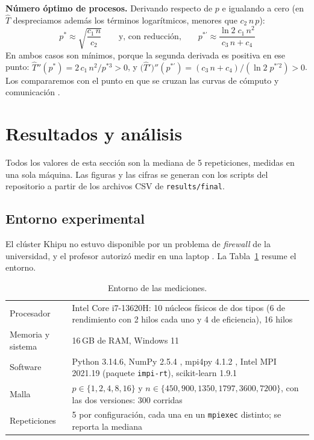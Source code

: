 \documentclass[11pt,a4paper]{article}
\begin{document}
\textbf{Número óptimo de procesos.} Derivando respecto de $p$ e igualando a cero (en $\hat T$ despreciamos además los términos logarítmicos, menores que $c_2\,n\,p$):
\[
p^*\approx\sqrt{\frac{c_1\,n}{c_2}}
\qquad\text{y, con reducción,}\qquad
p^{*\prime}\approx\frac{\ln 2\;c_1\,n^2}{c_3\,n+c_4}
\]
En ambos casos son mínimos, porque la segunda derivada es positiva en ese punto: $\hat T''(p^*)=2\,c_1\,n^2/p^{*3}>0$, y $\big(\hat T'\big)''(p^{*\prime})=(c_3\,n+c_4)/(\ln 2\;p^{*\prime 2})>0$. Los compararemos con el punto en que se cruzan las curvas de cómputo y comunicación \cite{slides}.

\section{Resultados y análisis}

Todos los valores de esta sección son la mediana de 5 repeticiones, medidas en una sola máquina. Las figuras y las cifras se generan con los scripts del repositorio a partir de los archivos CSV de \texttt{results/final}.

\subsection{Entorno experimental}
\label{sec:entorno}

El clúster Khipu no estuvo disponible por un problema de \textit{firewall} de la universidad, y el profesor autorizó medir en una laptop \cite{correo-profesor}. La Tabla~\ref{tab:entorno} resume el entorno.

\begin{table}[ht]
\centering\small
\begin{tabularx}{\linewidth}{lX}
  \toprule
  Procesador & Intel Core i7-13620H: 10 núcleos físicos de dos tipos (6 de rendimiento con 2 hilos cada uno y 4 de eficiencia), 16 hilos \\
  Memoria y sistema & 16\,GB de RAM, Windows 11 \\
  Software & Python 3.14.6, NumPy 2.5.4 \cite{numpy}, mpi4py 4.1.2 \cite{mpi4py}, Intel MPI 2021.19 (paquete \texttt{impi-rt}), scikit-learn 1.9.1 \cite{sklearn} \\
  Malla & $p\in\{1,2,4,8,16\}$ y $n\in\{450,900,1350,1797,3600,7200\}$, con las dos versiones: 300 corridas \\
  Repeticiones & 5 por configuración, cada una en un \texttt{mpiexec} distinto; se reporta la mediana \\
  \bottomrule
\end{tabularx}
\caption{Entorno de las mediciones.}
\label{tab:entorno}
\end{table}
\end{document}
